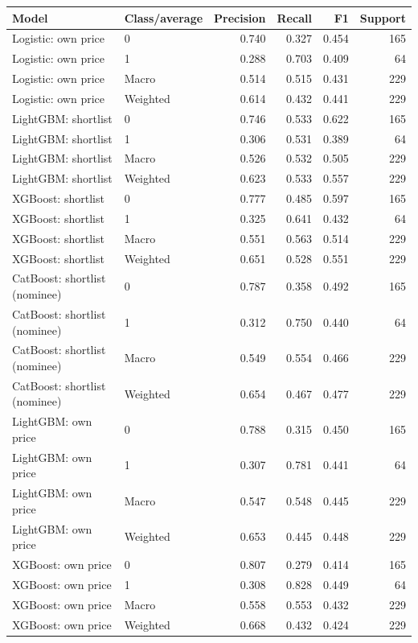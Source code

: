\begin{longtable}{@{}p{.34\linewidth}p{.15\linewidth}rrrr@{}}
\toprule Model & Class/average & Precision & Recall & F1 & Support\\\midrule\endhead
Logistic: own price & 0 & 0.740 & 0.327 & 0.454 & 165\\
Logistic: own price & 1 & 0.288 & 0.703 & 0.409 & 64\\
Logistic: own price & Macro & 0.514 & 0.515 & 0.431 & 229\\
Logistic: own price & Weighted & 0.614 & 0.432 & 0.441 & 229\\
LightGBM: shortlist & 0 & 0.746 & 0.533 & 0.622 & 165\\
LightGBM: shortlist & 1 & 0.306 & 0.531 & 0.389 & 64\\
LightGBM: shortlist & Macro & 0.526 & 0.532 & 0.505 & 229\\
LightGBM: shortlist & Weighted & 0.623 & 0.533 & 0.557 & 229\\
XGBoost: shortlist & 0 & 0.777 & 0.485 & 0.597 & 165\\
XGBoost: shortlist & 1 & 0.325 & 0.641 & 0.432 & 64\\
XGBoost: shortlist & Macro & 0.551 & 0.563 & 0.514 & 229\\
XGBoost: shortlist & Weighted & 0.651 & 0.528 & 0.551 & 229\\
CatBoost: shortlist (nominee) & 0 & 0.787 & 0.358 & 0.492 & 165\\
CatBoost: shortlist (nominee) & 1 & 0.312 & 0.750 & 0.440 & 64\\
CatBoost: shortlist (nominee) & Macro & 0.549 & 0.554 & 0.466 & 229\\
CatBoost: shortlist (nominee) & Weighted & 0.654 & 0.467 & 0.477 & 229\\
LightGBM: own price & 0 & 0.788 & 0.315 & 0.450 & 165\\
LightGBM: own price & 1 & 0.307 & 0.781 & 0.441 & 64\\
LightGBM: own price & Macro & 0.547 & 0.548 & 0.445 & 229\\
LightGBM: own price & Weighted & 0.653 & 0.445 & 0.448 & 229\\
XGBoost: own price & 0 & 0.807 & 0.279 & 0.414 & 165\\
XGBoost: own price & 1 & 0.308 & 0.828 & 0.449 & 64\\
XGBoost: own price & Macro & 0.558 & 0.553 & 0.432 & 229\\
XGBoost: own price & Weighted & 0.668 & 0.432 & 0.424 & 229\\

\end{longtable}
